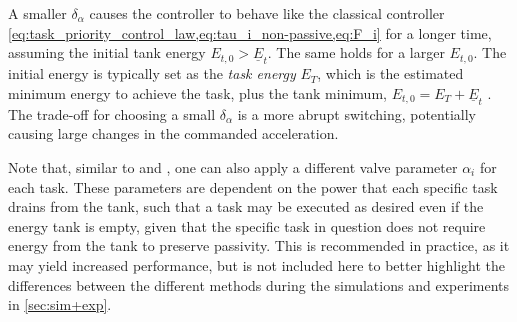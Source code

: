 \documentclass[../main.tex]{subfiles}
\begin{document}
A smaller $\delta_\alpha$ causes the controller to behave like the classical controller \cref{eq:task_priority_control_law,eq:tau_i_non-passive,eq:F_i} for a longer time, assuming the initial tank energy $E_{t,0} > \underline{E}_t$. The same holds for a larger $E_{t,0}$. The initial energy is typically set as the \textit{task energy} $E_T$, which is the estimated minimum energy to achieve the task, plus the tank minimum, $E_{t,0} = E_T + \underline{E}_t$ \cite{schindlbeckUnifiedPassivitybasedCartesian2015}. The trade-off for choosing a small $\delta_\alpha$ is a more abrupt switching, potentially causing large changes in the commanded acceleration.

Note that, similar to \cite{dietrichPassiveHierarchicalImpedance2017} and \cite{shahriariValvebasedVirtualEnergy2018}, one can also apply a different valve parameter $\alpha_i$ for each task. These parameters are dependent on the power that each specific task drains from the tank, such that a task may be executed as desired even if the energy tank is empty, given that the specific task in question does not require energy from the tank to preserve passivity. This is recommended in practice, as it may yield increased performance, but is not included here to better highlight the differences between the different methods during the simulations and experiments in \cref{sec:sim+exp}.

\end{document}
